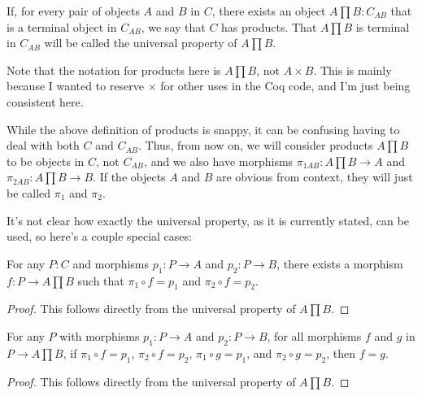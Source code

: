 \documentclass[../math.tex]{subfiles}
\begin{document}
\begin{class}
    If, for every pair of objects $A$ and $B$ in $C$, there exists an object $A
    \prod B : C_{AB}$ that is a terminal object in $C_{AB}$, we say that $C$ has
    products.  That $A \prod B$ is terminal in $C_{AB}$ will be called the
    universal property of $A \prod B$.
\end{class}

Note that the notation for products here is $A \prod B$, not $A \times B$.  This
is mainly because I wanted to reserve $\times$ for other uses in the Coq code,
and I'm just being consistent here.

While the above definition of products is snappy, it can be confusing having to
deal with both $C$ and $C_{AB}$.  Thus, from now on, we will consider products
$A \prod B$ to be objects in $C$, not $C_{AB}$, and we also have morphisms
$\pi_{1AB} : A \prod B \to A$ and $\pi_{2AB} : A \prod B \to B$.  If the objects
$A$ and $B$ are obvious from context, they will just be called $\pi_1$ and
$\pi_2$.

It's not clear how exactly the universal property, as it is currently stated,
can be used, so here's a couple special cases:

\begin{theorem} \label{product_f} \label{product_f1} \label{product_f2}
    For any $P : C$ and morphisms $p_1 : P \to A$ and $p_2 : P \to B$, there
    exists a morphism $f : P \to A \prod B$ such that $\pi_1 \circ f = p_1$ and
    $\pi_2 \circ f = p_2$.
\end{theorem}
\begin{proof}
    This follows directly from the universal property of $A \prod B$.
\end{proof}

\begin{theorem} \label{product_f_uni} \label{product_f_uni2}
    For any $P$ with morphisms $p_1 : P \to A$ and $p_2 : P \to B$, for all
    morphisms $f$ and $g$ in $P \to A \prod B$, if $\pi_1 \circ f = p_1$, $\pi_2
    \circ f = p_2$, $\pi_1 \circ g = p_1$, and $\pi_2 \circ g = p_2$, then $f =
    g$.
\end{theorem}
\begin{proof}
    This follows directly from the universal property of $A \prod B$.
\end{proof}
\end{document}
